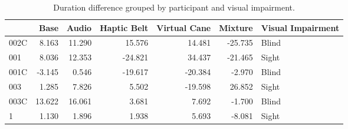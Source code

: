 
\begin{table}[!htb]
\centering
\caption{Duration difference grouped by participant and visual impairment.}
\label{tab:duracao_var_group}
\begin{tabular}{lrrrrrl}
\toprule
{} &   Base &  Audio &  Haptic Belt &  Virtual Cane &  Mixture & Visual Impairment \\
\midrule
002C &  8.163 & 11.290 &       15.576 &        14.481 &  -25.735 &             Blind \\
001  &  8.036 & 12.353 &      -24.821 &        34.437 &  -21.465 &             Sight \\
001C & -3.145 &  0.546 &      -19.617 &       -20.384 &   -2.970 &             Blind \\
003  &  1.285 &  7.826 &        5.502 &       -19.598 &   26.852 &             Sight \\
003C & 13.622 & 16.061 &        3.681 &         7.692 &   -1.700 &             Blind \\
1    &  1.130 &  1.896 &        1.938 &         5.693 &   -8.081 &             Sight \\
\bottomrule
\end{tabular}
\end{table}

